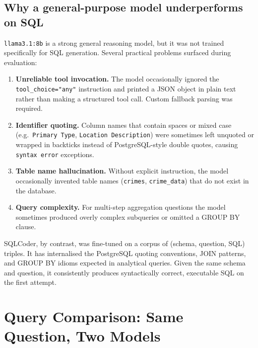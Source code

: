 \documentclass[12pt,a4paper]{article}
\begin{document}
\subsection{Why a general-purpose model underperforms on SQL}

\texttt{llama3.1:8b} is a strong general reasoning model, but it was not trained
specifically for SQL generation.  Several practical problems surfaced during evaluation:

\begin{enumerate}[leftmargin=*, itemsep=3pt]
    \item \textbf{Unreliable tool invocation.}  The model occasionally ignored the
          \texttt{tool\_choice="any"} instruction and printed a JSON object in plain
          text rather than making a structured tool call.  Custom fallback parsing was
          required.

    \item \textbf{Identifier quoting.}  Column names that contain spaces or mixed case
          (e.g.\ \texttt{Primary Type}, \texttt{Location Description}) were sometimes
          left unquoted or wrapped in backticks instead of PostgreSQL-style double
          quotes, causing \texttt{syntax error} exceptions.

    \item \textbf{Table name hallucination.}  Without explicit instruction, the model
          occasionally invented table names (\texttt{crimes}, \texttt{crime\_data})
          that do not exist in the database.

    \item \textbf{Query complexity.}  For multi-step aggregation questions the model
          sometimes produced overly complex subqueries or omitted a GROUP BY clause.
\end{enumerate}

SQLCoder, by contrast, was fine-tuned on a corpus of (schema, question, SQL) triples.
It has internalised the PostgreSQL quoting conventions, JOIN patterns, and GROUP BY
idioms expected in analytical queries.  Given the same schema and question, it
consistently produces syntactically correct, executable SQL on the first attempt.

\section{Query Comparison: Same Question, Two Models}
\end{document}
